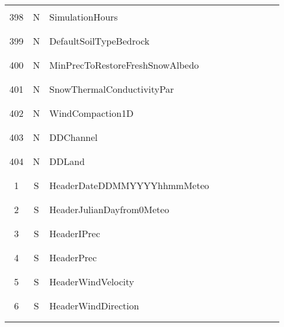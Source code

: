\begin{longtable}{|c|c|l|c|c|c|c|p{}|c|p{}|}
&&&&&&&&&\\
398 & N & SimulationHours & & & & & & & \\
&&&&&&&&&\\\hline%
&&&&&&&&&\\
399 & N & DefaultSoilTypeBedrock & & & & & & & \\
&&&&&&&&&\\\hline%
&&&&&&&&&\\
400 & N & MinPrecToRestoreFreshSnowAlbedo & & & & & & & \\
&&&&&&&&&\\\hline%
&&&&&&&&&\\
401 & N & SnowThermalConductivityPar & & & & & & & \\
&&&&&&&&&\\\hline%
&&&&&&&&&\\
402 & N & WindCompaction1D & & & & & & & \\
&&&&&&&&&\\\hline%
&&&&&&&&&\\
403 & N & DDChannel & & & & & & & \\
&&&&&&&&&\\\hline%
&&&&&&&&&\\
404 & N & DDLand & & & & & & & \\
&&&&&&&&&\\\hline%
&&&&&&&&&\\
1 & S & HeaderDateDDMMYYYYhhmmMeteo & & & & & & & \\
&&&&&&&&&\\\hline%
&&&&&&&&&\\
2 & S & HeaderJulianDayfrom0Meteo & & & & & & & \\
&&&&&&&&&\\\hline%
&&&&&&&&&\\
3 & S & HeaderIPrec & & & & & & & \\
&&&&&&&&&\\\hline%
&&&&&&&&&\\
4 & S & HeaderPrec & & & & & & & \\
&&&&&&&&&\\\hline%
&&&&&&&&&\\
5 & S & HeaderWindVelocity & & & & & & & \\
&&&&&&&&&\\\hline%
&&&&&&&&&\\
6 & S & HeaderWindDirection & & & & & & & \\
&&&&&&&&&\\\hline%
&&&&&&&&&\\

\end{longtable}
